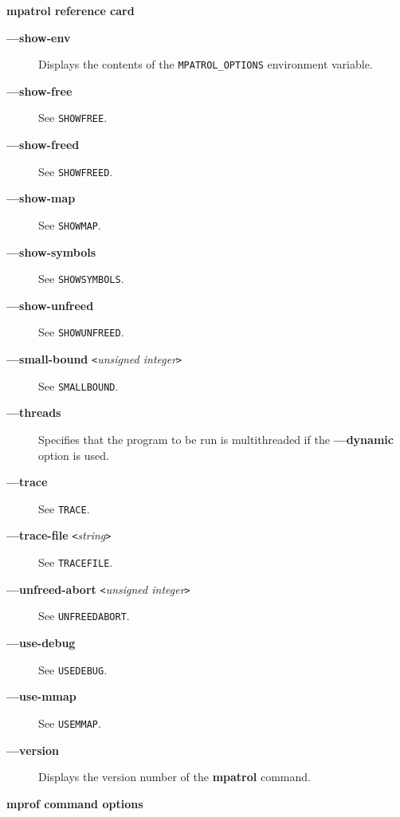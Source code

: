 \documentclass[a4paper,landscape,final]{article}
\newcommand{\heading}[1]{\textbf{\normalsize #1}}
\newcommand{\command}[1]{\textbf{#1}}
\newcommand{\flag}[1]{\textbf{---#1}}
\newcommand{\flagpar}[2]{\flag{#1} \texttt{<}\textit{#2}\texttt{>}}
\newcommand{\option}[1]{\texttt{#1}}
\begin{document}
\begin{multicols}{3}{\textbf{\Large mpatrol reference card}}
\begin{description}
\item[\flag{show-env}]
Displays the contents of the \texttt{MPATROL\_OPTIONS} environment variable.
\item[\flag{show-free}]
\hfill See \option{SHOWFREE}.
\item[\flag{show-freed}]
\hfill See \option{SHOWFREED}.
\item[\flag{show-map}]
\hfill See \option{SHOWMAP}.
\item[\flag{show-symbols}]
\hfill See \option{SHOWSYMBOLS}.
\item[\flag{show-unfreed}]
\hfill See \option{SHOWUNFREED}.
\item[\flagpar{small-bound}{unsigned integer}]
\hfill See \option{SMALLBOUND}.
\item[\flag{threads}]
Specifies that the program to be run is multithreaded if the \flag{dynamic}
option is used.
\item[\flag{trace}]
\hfill See \option{TRACE}.
\item[\flagpar{trace-file}{string}]
\hfill See \option{TRACEFILE}.
\item[\flagpar{unfreed-abort}{unsigned integer}]
\hfill See \option{UNFREEDABORT}.
\item[\flag{use-debug}]
\hfill See \option{USEDEBUG}.
\item[\flag{use-mmap}]
\hfill See \option{USEMMAP}.
\item[\flag{version}]
Displays the version number of the \command{mpatrol} command.
\end{description}

\vskip 12pt
\heading{mprof command options}
\vskip 6pt


\end{multicols}
\end{document}

